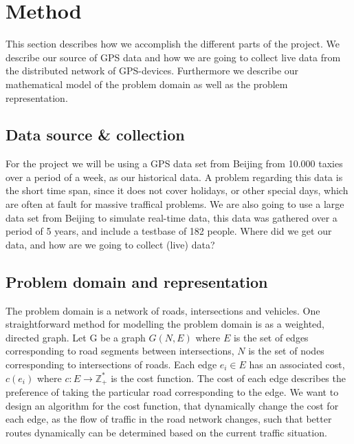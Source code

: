 \section{Method}
This section describes how we accomplish the different parts of the project. We describe our source of GPS data and how we are going to collect live data from the distributed network of GPS-devices. Furthermore we describe our mathematical model of the problem domain as well as the problem representation.

\subsection*{Data source \& collection}
For the project we will be using a GPS data set from Beijing from 10.000 taxies over a period of a week, as our historical data. A problem regarding this data is the short time span, since it does not cover holidays, or other special days, which are often at fault for massive traffical problems. We are also going to use a large data set from Beijing to simulate real-time data, this data was gathered over a period of 5 years, and include a testbase of 182 people.
Where did we get our data, and how are we going to collect (live) data?

\subsection*{Problem domain and representation}
The problem domain is a network of roads, intersections and vehicles. One straightforward method for modelling the problem domain is as a weighted, directed graph. Let G be a graph $G(N,E)$ where $E$ is the set of edges corresponding to road segments between intersections, $N$ is the set of nodes corresponding to intersections of roads. Each edge $e_i \in E$ has an associated cost, $c(e_i)$ where  $c: E \rightarrow \mathbb Z_+^*$ is the cost function. The cost of each edge describes the preference of taking the particular road corresponding to the edge. We want to design an algorithm for the cost function, that dynamically change the cost for each edge, as the flow of traffic in the road network changes, such that better routes dynamically can be determined based on the current traffic situation.


